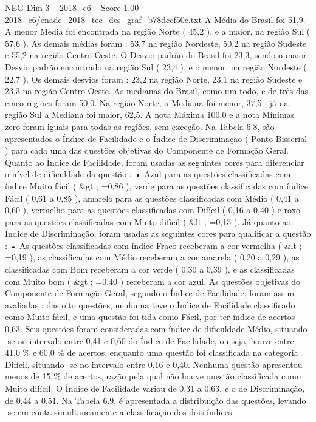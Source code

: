 \begin{textsample}{NEG Dim 3 – 2018\_c6 – Score 1.00 – 2018\_c6/enade\_2018\_tec\_des\_graf\_b78dccf50c.txt}
A Média do Brasil foi 51,9.
A menor Média foi encontrada na região Norte ( 45,2 ), e a maior, na região Sul ( 57,6 ).
As demais médias foram : 53,7 na região Nordeste, 50,2 na região Sudeste e 55,2 na região Centro-Oeste.
O Desvio padrão do Brasil foi 23,3, sendo o maior Desvio padrão encontrado na região Sul ( 23,4 ), e o menor, na região Nordeste ( 22,7 ).
Os demais desvios foram : 23,2 na região Norte, 23,1 na região Sudeste e 23,3 na região Centro-Oeste.
As medianas do Brasil, como um todo, e de três das cinco regiões foram 50,0.
Na região Norte, a Mediana foi menor, 37,5 ; já na região Sul a Mediana foi maior, 62,5.
A nota Máxima 100,0 e a nota Mínimas zero foram iguais para todas as regiões, sem exceção.
Na Tabela 6.8, são apresentados o Índice de Facilidade e o Índice de Discriminação ( Ponto-Bisserial ) para cada uma das questões objetivas do Componente de Formação Geral.
Quanto ao Índice de Facilidade, foram usadas as seguintes cores para diferenciar o nível de dificuldade da questão : • Azul para as questões classificadas com índice Muito fácil ( \&gt ; =0,86 ), verde para as questões classificadas com índice Fácil ( 0,61 a 0,85 ), amarelo para as questões classificadas com Médio ( 0,41 a 0,60 ), vermelho para as questões classificadas com Difícil ( 0,16 a 0,40 ) e roxo para as questões classificadas com Muito difícil ( \&lt ; =0,15 ).
Já quanto ao Índice de Discriminação, foram usadas as seguintes cores para qualificar a questão : • As questões classificadas com índice Fraco receberam a cor vermelha ( \&lt ; =0,19 ), as classificadas com Médio receberam a cor amarela ( 0,20 a 0,29 ), as classificadas com Bom receberam a cor verde ( 0,30 a 0,39 ), e as classificadas com Muito bom ( \&gt ; =0,40 ) receberam a cor azul.
As questões objetivas do Componente de Formação Geral, segundo o Índice de Facilidade, foram assim avaliadas : das oito questões, nenhuma teve o Índice de Facilidade classificado como Muito fácil, e uma questão foi tida como Fácil, por ter índice de acertos 0,63.
Seis questões foram consideradas com índice de dificuldade Médio, situando -se no intervalo entre 0,41 e 0,60 do Índice de Facilidade, ou seja, houve entre 41,0 \% e 60,0 \% de acertos, enquanto uma questão foi classificada na categoria Difícil, situando -se no intervalo entre 0,16 e 0,40.
Nenhuma questão apresentou menos de 15 \% de acertos, razão pela qual não houve questão classificada como Muito difícil.
O Índice de Facilidade variou de 0,31 a 0,63, e o de Discriminação, de 0,44 a 0,51.
Na Tabela 6.9, é apresentada a distribuição das questões, levando -se em conta simultaneamente a classificação dos dois índices.

\end{textsample}
